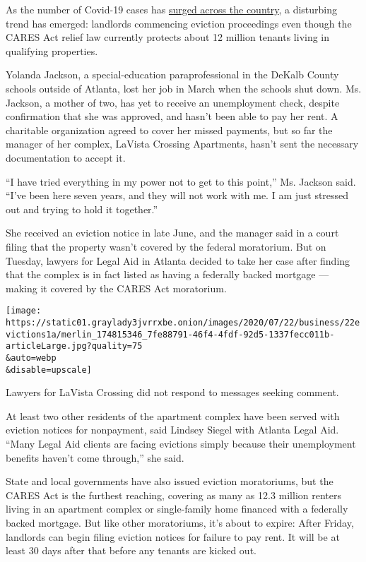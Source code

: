 As the number of Covid-19 cases has
\href{https://www.nytimes3xbfgragh.onion/interactive/2020/us/coronavirus-us-cases.html}{surged
across the country}, a disturbing trend has emerged: landlords
commencing eviction proceedings even though the CARES Act relief law
currently protects about 12 million tenants living in qualifying
properties.

Yolanda Jackson, a special-education paraprofessional in the DeKalb
County schools outside of Atlanta, lost her job in March when the
schools shut down. Ms. Jackson, a mother of two, has yet to receive an
unemployment check, despite confirmation that she was approved, and
hasn't been able to pay her rent. A charitable organization agreed to
cover her missed payments, but so far the manager of her complex,
LaVista Crossing Apartments, hasn't sent the necessary documentation to
accept it.

``I have tried everything in my power not to get to this point,'' Ms.
Jackson said. ``I've been here seven years, and they will not work with
me. I am just stressed out and trying to hold it together.''

She received an eviction notice in late June, and the manager said in a
court filing that the property wasn't covered by the federal moratorium.
But on Tuesday, lawyers for Legal Aid in Atlanta decided to take her
case after finding that the complex is in fact listed as having a
federally backed mortgage --- making it covered by the CARES Act
moratorium.

\texttt{[image: https://static01.graylady3jvrrxbe.onion/images/2020/07/22/business/22evictions1a/merlin\_174815346\_7fe88791-46f4-4fdf-92d5-1337fecc011b-articleLarge.jpg?quality=75\\\&auto=webp\\\&disable=upscale]}

Lawyers for LaVista Crossing did not respond to messages seeking
comment.

At least two other residents of the apartment complex have been served
with eviction notices for nonpayment, said Lindsey Siegel with Atlanta
Legal Aid. ``Many Legal Aid clients are facing evictions simply because
their unemployment benefits haven't come through,'' she said.

State and local governments have also issued eviction moratoriums, but
the CARES Act is the furthest reaching, covering as many as 12.3 million
renters living in an apartment complex or single-family home financed
with a federally backed mortgage. But like other moratoriums, it's about
to expire: After Friday, landlords can begin filing eviction notices for
failure to pay rent. It will be at least 30 days after that before any
tenants are kicked out.

